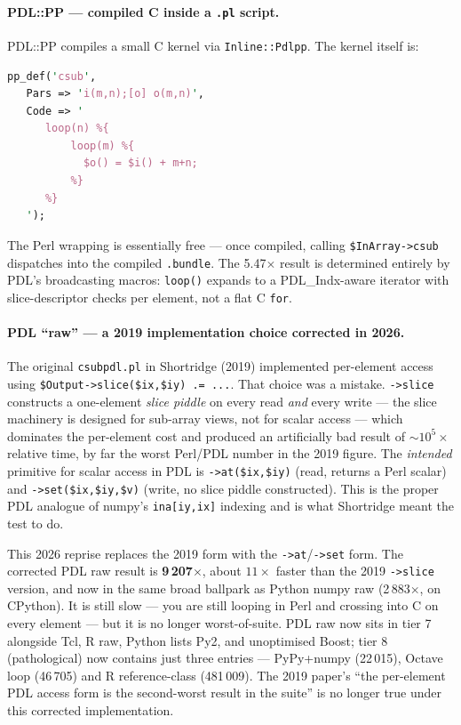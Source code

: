 \documentclass[11pt,a4paper]{article}
\begin{document}
\paragraph{PDL::PP --- compiled C inside a \texttt{.pl} script.}
PDL::PP compiles a small C kernel via \texttt{Inline::Pdlpp}. The
kernel itself is:

\begin{lstlisting}[language=Perl]
pp_def('csub',
   Pars => 'i(m,n);[o] o(m,n)',
   Code => '
      loop(n) %{
          loop(m) %{
            $o() = $i() + m+n;
          %}
      %}
   ');
\end{lstlisting}

\noindent
The Perl wrapping is essentially free --- once compiled, calling
\verb|$InArray->csub| dispatches into the compiled \texttt{.bundle}.
The 5.47$\times$ result is determined entirely by PDL's broadcasting
macros: \verb|loop()| expands to a PDL\_Indx-aware iterator with
slice-descriptor checks per element, not a flat C \verb|for|.

\paragraph{PDL ``raw'' --- a 2019 implementation choice corrected
in 2026.}
The original \texttt{csubpdl.pl} in Shortridge (2019) implemented
per-element access using \verb|$Output->slice($ix,$iy) .= ...|.
That choice was a mistake. \verb|->slice| constructs a one-element
\emph{slice piddle} on every read \emph{and} every write --- the
slice machinery is designed for sub-array views, not for scalar
access --- which dominates the per-element cost and produced an
artificially bad result of $\sim\!10^5\times$ relative time, by
far the worst Perl/PDL number in the 2019 figure. The
\emph{intended} primitive for scalar access in PDL is
\verb|->at($ix,$iy)| (read, returns a Perl scalar) and
\verb|->set($ix,$iy,$v)| (write, no slice piddle constructed).
This is the proper PDL analogue of numpy's \verb|ina[iy,ix]|
indexing and is what Shortridge meant the test to do.

This 2026 reprise replaces the 2019 form with the
\verb|->at|/\verb|->set| form. The corrected PDL raw result is
\textbf{9\,207$\times$}, about $11\times$ faster than the 2019
\verb|->slice| version, and now in the same broad ballpark as
Python numpy raw (2\,883$\times$, on CPython). It is still slow ---
you are still looping in Perl and crossing into C on every
element --- but it is no longer worst-of-suite. PDL raw now sits
in tier 7 alongside Tcl, R raw, Python lists Py2, and unoptimised
Boost; tier 8 (pathological) now contains just three entries ---
PyPy+numpy (22\,015), Octave loop (46\,705) and R reference-class
(481\,009). The
2019 paper's ``the per-element PDL access form is the second-worst
result in the suite'' is no longer true under this corrected
implementation.
\end{document}
